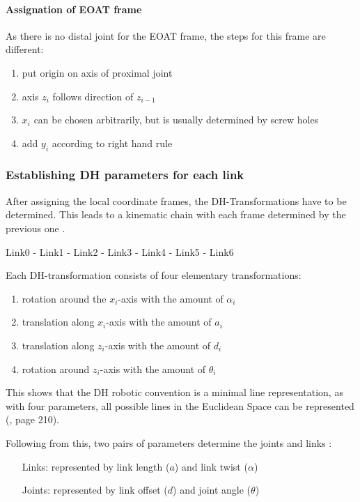 \paragraph{Assignation of \ac{EOAT} frame}
As there is no distal joint for the \ac{EOAT} frame, the steps for this frame are different:

\begin{enumerate}[label=\emph{\alph*)}]
	\item put origin on axis of proximal joint 
	\item axis $z_i$ follows direction of $z_{i-1}$
	\item $x_i$ can be chosen arbitrarily, but is usually determined by screw holes
	\item add $y_i$ according to right hand rule
\end{enumerate}


\subsubsection{Establishing \ac{DH} parameters for each link} \label{sec:DHparPerLink}

After assigning the local coordinate frames, the \ac{DH}-Transformations have to be determined. This leads to a kinematic chain with each frame determined by the previous one \cite{DenavitHartenbergKonventionen}.

Link0 - Link1 - Link2 - Link3 - Link4 - Link5 - Link6

Each \ac{DH}-transformation consists of four elementary transformations\cite{DenavitHartenbergKonventionen}:

\begin{enumerate}[label=\emph{\arabic*)}]
	\item rotation around the $x_i$-axis with the amount of $\alpha_i$
	\item translation along $x_i$-axis with the amount of  $a_i$
	\item translation along $z_i$-axis with the amount of  $d_i$
	\item rotation around $z_i$-axis with the amount of  $\theta_i$
\end{enumerate}

This shows that the \ac{DH} robotic convention is a minimal line representation, as with four parameters, all possible lines in the Euclidean Space can be represented (\cite{AutRobVeh}, page 210).

Following from this, two pairs of parameters determine the joints and links \cite{ConstantinForwardKA}:
\begin{itemize}[wide=\parindent] 
	\item[Links:] represented by link length ($a$) and link twist ($\alpha$)
	\item[Joints:] represented by link offset ($d$)
	and joint angle ($\theta$) 
\end{itemize}

